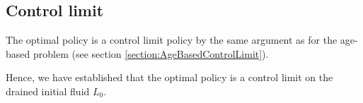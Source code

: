 \subsection{Control limit}
The optimal policy is a control limit policy by the same argument as for the age-based problem (see section \ref{section:AgeBasedControlLimit}). 
%

Hence, we have established that the optimal policy is a control limit on the drained initial fluid $L_0$.